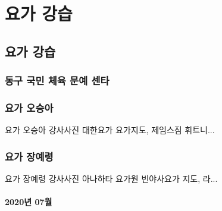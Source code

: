 \documentclass[12pt, a4paper, oneside]{book}
\let\stdsection\section
\renewcommand\section{\newpage\stdsection}
\begin{document}
	\part{요가 강습}
	\noptcrule
	\parttoc				


	\chapter{요가 강습}

%
	\section{동구 국민 체육 문예 센타}


%
	\section{요가 오승아}

		요가 오승아 
		강사사진
		대한요가 요가지도, 제임스짐 휘트니...

%
	\section{요가 장예령}

		요가 장예령 
		강사사진
		아나하타 요가원 빈야사요가 지도, 라...


	\subsection{2020년 07월}
\end{document}
